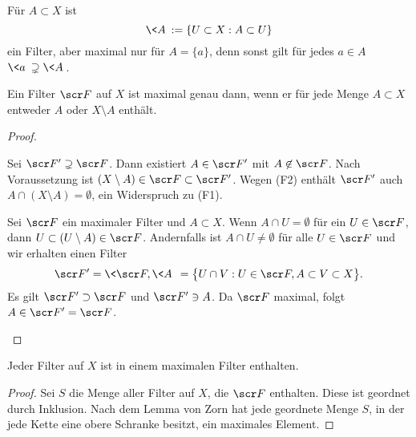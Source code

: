 \begin{ex}
	Für $A \subset X$ ist
	\[
		\< A \> := \{ U \subset X : A \subset U \}
	\]
	ein Filter, aber maximal nur für $A = \{a\}$, denn sonst gilt für jedes $a \in A$ $\<a\> \supsetneq \<A\>$.
\end{ex}

\begin{st}
	Ein Filter $\scr F$ auf $X$ ist maximal genau dann, wenn er für jede Menge $A \subset X$ entweder $A$ oder $X \setminus A$ enthält.
	\begin{proof}
		\begin{segnb}[„$\impliedby$“]
			Sei $\scr F' \supsetneq \scr F$.
			Dann existiert $A \in \scr F'$ mit $A \not\in \scr F$.
			Nach Voraussetzung ist $(X \setminus A) \in \scr F \subset \scr F'$.
			Wegen (F2) enthält $\scr F'$ auch $A \cap (X \setminus A) = \emptyset$, ein Widerspruch zu (F1).
		\end{segnb}
		\begin{segnb}[„$\implies$“]
			Sei $\scr F$ ein maximaler Filter und $A \subset X$.
			Wenn $A \cap U = \emptyset$ für ein $U \in \scr F$, dann $U \subset (U \setminus A) \in \scr F$.
			Andernfalls ist $A \cap U \neq \emptyset$ für alle $U \in \scr F$ und wir erhalten einen Filter
			\[
				\scr F' = \<\scr F, \<A\> \>
				= \big\{ U \cap V : U \in \scr F, A \subset V \subset X \big\}.
			\]
			Es gilt $\scr F' \supset \scr F$ und $\scr F' \ni A$.
			Da $\scr F$ maximal, folgt $A \in \scr F' = \scr F$.
		\end{segnb}
	\end{proof}
\end{st}

\begin{st}
	Jeder Filter auf $X$ ist in einem maximalen Filter enthalten.
	\begin{proof}
		Sei $S$ die Menge aller Filter auf $X$, die $\scr F$ enthalten.
		Diese ist geordnet durch Inklusion.
		Nach dem Lemma von Zorn hat jede geordnete Menge $S$, in der jede Kette eine obere Schranke besitzt, ein maximales Element.
	\end{proof}
\end{st}
